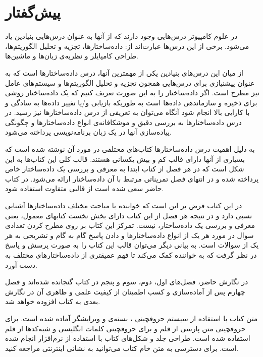 \section*{پیش‌گفتار}
در علوم کامپیوتر درس‌هایی وجود دارند که از آنها به عنوان درس‌هایی بنیادین یاد می‌شود. برخی از این درس‌ها عبارت‌اند از: داده‌ساختارها، تجزیه و تحلیل الگوریتم‌ها، طراحی کامپایلر و نظریه‌ی زبان‌ها و ماشین‌ها.

از میان این درس‌های بنیادین یکی از مهمترین آنها، درس داده‌ساختارها است که به عنوان پیشنیازی برای درس‌هایی همچون تجزیه و تحلیل الگوریتم‌ها و سیستم‌های عامل نیز مطرح است. اگر داده‌ساختار را به این صورت تعریف کنیم که {\prq}یک داده‌ساختار روشی برای ذخیره و سازماندهی داده‌ها است به طوریکه بازیابی و/یا تغییر داده‌ها به سادگی و با کارایی بالا انجام شود{\plq} آنگاه می‌توان به تعریفی از درس داده‌ساختارها نیز رسید. در درس داده‌ساختارها به بررسی دقیق و موشکافانه‌ی انواع داده‌ساختارها و چگونگی پیاده‌سازی آنها در یک زبان برنامه‌نویسی پرداخته می‌شود.

به دلیل اهمیت درس داده‌ساختارها کتاب‌های مختلفی در مورد آن نوشته شده است که بسیاری از آنها دارای قالب کم و بیش یکسانی هستند. قالب کلی این کتاب‌ها به این شکل است که در هر فصل از کتاب ابتدا به معرفی و بررسی یک داده‌ساختار خاص پرداخته شده و در انتهای فصل تمریناتی مرتبط با آن داده‌ساختار ارائه می‌شود. در کتاب حاضر سعی شده است از قالبی متفاوت استفاده شود.

در این کتاب فرض بر این است که خواننده با مباحث مختلف داده‌ساختارها آشنایی نسبی دارد و در نتیجه هر فصل از این کتاب دارای بخش نخست کتابهای معمول، یعنی معرفی و بررسی یک داده‌ساختار، نیست. تمرکز این کتاب بر روی مطرح کردن تعدادی سوال در مورد هر یک از انواع داده‌ساختارها و دادن پاسخ گام به گام و تشریحی به هر یک از سوالات است. به بیانی دیگر می‌توان قالب این کتاب را به صورت پرسش و پاسخ در نظر گرفت که به خواننده کمک می‌کند تا فهم عمیقتری از داده‌ساختارهای مختلف به دست آورد.

در نگارش حاضر، فصل‌های اول، دوم، سوم و پنجم در کتاب گنجانده شده‌اند و فصل چهارم پس از آماده‌سازی و کسب اطمینان از کیفیت علمی و ظاهری آن در نگارش‌ بعدی به کتاب افزوده خواهد شد.

متن کتاب با استفاده از سیستم حروفچینی {\lr{\LaTeX}}، بسته‌ی {\lr{\XePersian}} و ویرایشگر {} آماده شده است. برای حروفچینی متن پارسی از قلم {} و برای حروفچینی کلمات انگلیسی و شبه‌کدها از قلم {} استفاده شده است. طراحی جلد و شکل‌های کتاب با استفاده از نرم‌افزار {} انجام شده است. برای دسترسی به متن خام کتاب می‌توانید به نشانی اینترنتی {} مراجعه کنید.

